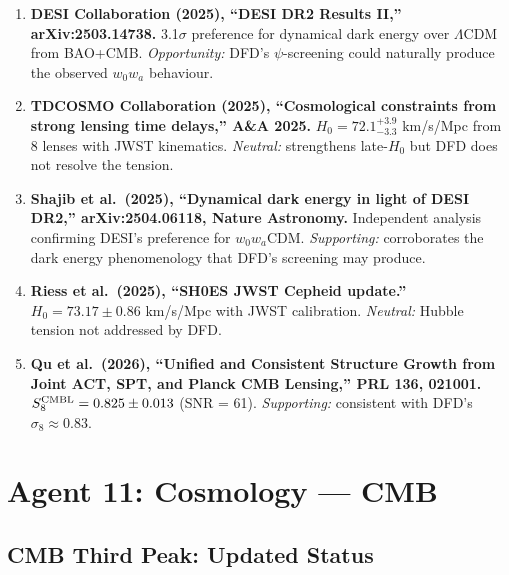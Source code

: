 \documentclass[11pt]{article}
\newcommand{\LCDM}{$\Lambda$CDM}
\newcommand{\Hzero}{H_0}
\begin{document}
\begin{tcolorbox}[colback=green!5!white, colframe=green!50!black,
  title=\textbf{Agent 10: NEW LITERATURE REVIEWED}]

\begin{enumerate}

\item \textbf{DESI Collaboration (2025), ``DESI DR2 Results II,''
  arXiv:2503.14738.}
  3.1$\sigma$ preference for dynamical dark energy over \LCDM{} from
  BAO+CMB. \emph{Opportunity:} DFD's $\psi$-screening could naturally
  produce the observed $w_0w_a$ behaviour.

\item \textbf{TDCOSMO Collaboration (2025), ``Cosmological constraints
  from strong lensing time delays,'' A\&A 2025.}
  $\Hzero = 72.1^{+3.9}_{-3.3}$ km/s/Mpc from 8 lenses with JWST
  kinematics. \emph{Neutral:} strengthens late-$\Hzero$ but DFD
  does not resolve the tension.

\item \textbf{Shajib et al.\ (2025), ``Dynamical dark energy in light
  of DESI DR2,'' arXiv:2504.06118, Nature Astronomy.}
  Independent analysis confirming DESI's preference for $w_0w_a$CDM.
  \emph{Supporting:} corroborates the dark energy phenomenology that
  DFD's screening may produce.

\item \textbf{Riess et al.\ (2025), ``SH0ES JWST Cepheid update.''}
  $\Hzero = 73.17 \pm 0.86$ km/s/Mpc with JWST calibration.
  \emph{Neutral:} Hubble tension not addressed by DFD.

\item \textbf{Qu et al.\ (2026), ``Unified and Consistent Structure
  Growth from Joint ACT, SPT, and Planck CMB Lensing,''
  PRL 136, 021001.}
  $S_8^{\rm CMBL} = 0.825 \pm 0.013$ (SNR = 61). \emph{Supporting:}
  consistent with DFD's $\sigma_8 \approx 0.83$.

\end{enumerate}
\end{tcolorbox}

\section{Agent 11: Cosmology --- CMB}

\subsection{CMB Third Peak: Updated Status}
\end{document}
